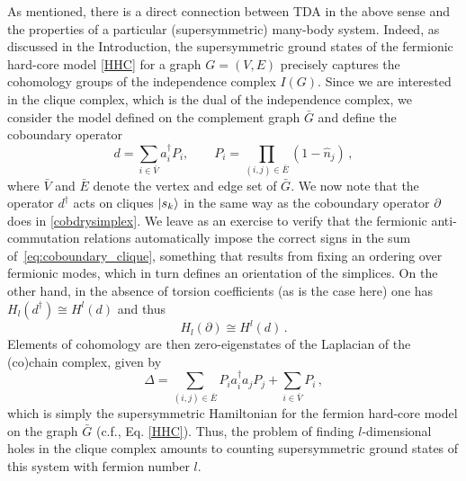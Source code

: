 \documentclass[11pt]{article}
\numberwithin{equation}{section}
\newcommand\equ[1] {\begin{equation}#1\end{equation}}
\renewcommand\( {\left(}
\renewcommand\) {\right)}
\begin{document}
As mentioned, there is a direct connection between TDA in the above sense and the properties of a particular (supersymmetric) many-body  system. Indeed, as discussed in the Introduction, the supersymmetric ground states of the fermionic hard-core model \eqref{HHC} for a graph $G=(V,E)$ precisely captures the cohomology groups of the independence complex $I(G)$. Since we are interested in the clique complex, which is the dual of the independence complex, we consider the model defined on the complement graph $\bar G$ and define the coboundary operator 
\equ{\label{eq:coboundary_clique}
    d = \sum_{i \in \bar{V}} a_i^\dagger P_i, \qquad P_i = \prod_{(i,j)\in \bar E} (1 - \hat{n}_j)\,,
}
where $\bar V$ and $\bar E$ denote the vertex and edge set of $\bar G$. We now note that the operator $d^\dagger$ acts on cliques $\ket{s_k}$ in the same way as the coboundary operator $\partial$ does in \eqref{cobdrysimplex}. We leave as an exercise to verify that the fermionic anti-commutation relations automatically impose the correct signs in the sum of~\eqref{eq:coboundary_clique}, something that results from fixing an ordering over fermionic modes, which in turn defines an orientation of the simplices. On the other hand,  in the absence of torsion coefficients (as is the case here) one has $H_l(d^\dagger)\cong H^l(d)$ and thus 
\equ{H_{l}(\partial)\cong H^{l}(d)\,.
} 
Elements of cohomology are then zero-eigenstates of the Laplacian of the (co)chain complex,  given by
\equ{\label{eq:fhm_laplacian}
    \Delta = \sum_{(i,j) \in \bar{E}} P_i a_i^\dagger a_j P_j + \sum_{i \in \bar{V}} P_i\,,
}
which is simply the supersymmetric Hamiltonian for the fermion hard-core model on the graph $\bar G$ (c.f., Eq. \eqref{HHC}). Thus, the problem of finding $l$-dimensional holes in the clique complex amounts to counting supersymmetric ground states of this system with fermion number $l$. 
%
\end{document}
